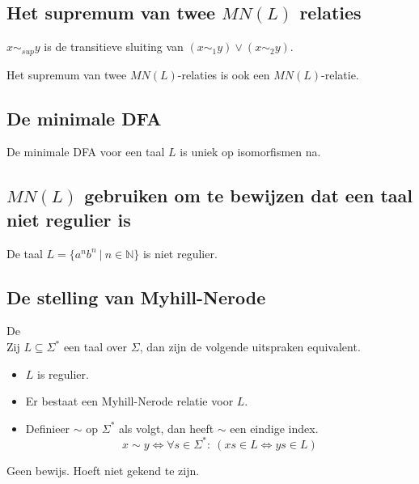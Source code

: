 \documentclass[main.tex]{subfiles}
\begin{document}
\subsection{Het supremum van twee $MN(L)$ relaties}
\label{sec:het-supremum-van}

\begin{de}
  $x\sim_{sup} y$ is de transitieve sluiting van $(x \sim_{1} y) \vee (x \sim_{2} y)$.
\end{de}

\begin{st}
  Het supremum van twee $MN(L)$-relaties is ook een $MN(L)$-relatie.

\end{st}

\subsection{De minimale DFA}
\label{sec:de-minimale-dfa}

\begin{st}
  De minimale DFA voor een taal $L$ is uniek op isomorfismen na.

\end{st}

\subsection{$MN(L)$ gebruiken om te bewijzen dat een taal niet regulier is}
\label{sec:mnl-gebruiken-om}

\begin{st}
  De taal $L= \{ a^{n}b^{n} \ |\ n\in \mathbb{N} \} $ is niet regulier.

\end{st}

\subsection{De stelling van Myhill-Nerode}
\label{sec:de-stelling-van}

\begin{st}
  De \\
  Zij $L\subseteq \Sigma^{*}$ een taal over $\Sigma$, dan zijn de volgende uitspraken equivalent.
  \begin{itemize}
  \item $L$ is regulier.
  \item Er bestaat een Myhill-Nerode relatie voor $L$.
  \item Definieer $\sim$ op $\Sigma^{*}$ als volgt, dan heeft $\sim$ een eindige index.
    \[ x \sim y \Leftrightarrow \forall s \in \Sigma^{*}:\ (xs \in L \Leftrightarrow ys \in L) \]
  \end{itemize}
  Geen bewijs. Hoeft niet gekend te zijn.
\end{st}
\end{document}
